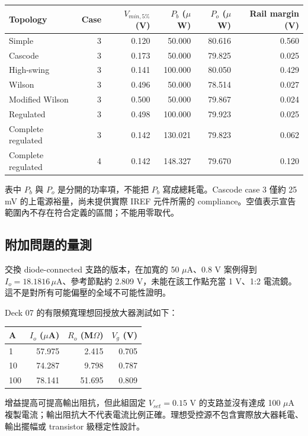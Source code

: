 \begin{center}\small
\begin{tabular}{lrrrrr}
\toprule
Topology & Case & $V_{min,5\%}$ (V) & $P_b$ ($\mu$W) & $P_o$ ($\mu$W) & Rail margin (V) \\
\midrule
Simple & 3 & 0.120 & 50.000 & 80.616 & 0.560 \\
Cascode & 3 & 0.173 & 50.000 & 79.825 & 0.025 \\
High-swing & 3 & 0.141 & 100.000 & 80.050 & 0.429 \\
Wilson & 3 & 0.496 & 50.000 & 78.514 & 0.027 \\
Modified Wilson & 3 & 0.500 & 50.000 & 79.867 & 0.024 \\
Regulated & 3 & 0.498 & 100.000 & 79.923 & 0.025 \\
Complete regulated & 3 & 0.142 & 130.021 & 79.823 & 0.062 \\
Complete regulated & 4 & 0.142 & 148.327 & 79.670 & 0.120 \\
\bottomrule
\end{tabular}
\end{center}

表中 $P_b$ 與 $P_o$ 是分開的功率項，不能把 $P_b$ 寫成總耗電。Cascode case 3 僅約 25 mV 的上電源裕量，尚未提供實際 IREF 元件所需的 compliance。空值表示宣告範圍內不存在符合定義的區間；不能用零取代。

\subsection{附加問題的量測}
交換 diode-connected 支路的版本，在加寬的 50 $\mu$A、0.8 V 案例得到 $I_o=18.1816\,\mu$A、參考節點約 2.809 V，未能在該工作點充當 1 V、1:2 電流鏡。這不是對所有可能偏壓的全域不可能性證明。

Deck 07 的有限頻寬理想回授放大器測試如下：

\begin{center}\small
\begin{tabular}{lrrr}
\toprule
A & $I_o$ ($\mu$A) & $R_o$ (M$\Omega$) & $V_g$ (V) \\
\midrule
1 & 57.975 & 2.415 & 0.705 \\
10 & 74.287 & 9.798 & 0.787 \\
100 & 78.141 & 51.695 & 0.809 \\
\bottomrule
\end{tabular}
\end{center}

增益提高可提高輸出阻抗，但此組固定 $V_{set}=0.15$ V 的支路並沒有達成 100 $\mu$A 複製電流；輸出阻抗大不代表電流比例正確。理想受控源不包含實際放大器耗電、輸出擺幅或 transistor 級穩定性設計。

